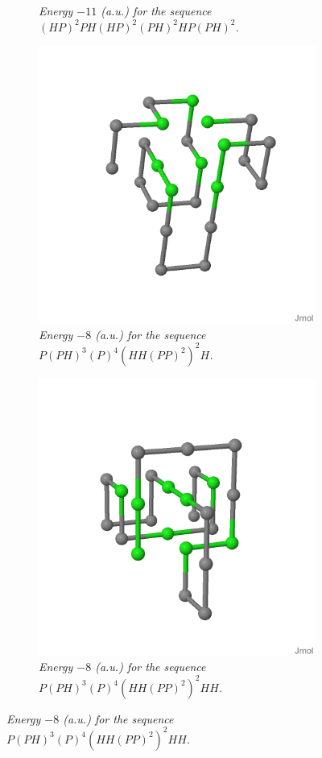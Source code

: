 \begin{figure}[H]
\begin{subfigure}[b]{0.45\textwidth}
        \caption{\emph{Energy $-11$ (a.u.) for the sequence $(HP)^2PH(HP)^2(PH)^2HP(PH)^2$.}}
    \end{subfigure}
    \begin{subfigure}[b]{0.45\textwidth}
        \centering
        \includegraphics[width=\textwidth]{./img/24_3D.png}
        \caption{\emph{Energy $-8$ (a.u.) for the sequence $P(PH)^3(P)^4(HH(PP)^2)^2H$.}}
    \end{subfigure}
    \begin{subfigure}[b]{0.45\textwidth}
        \centering
        \includegraphics[width=\textwidth]{./img/25_3D.png}
        \caption{\emph{Energy $-8$ (a.u.) for the sequence $P(PH)^3(P)^4(HH(PP)^2)^2HH$.}}
    \end{subfigure}


\end{figure}
